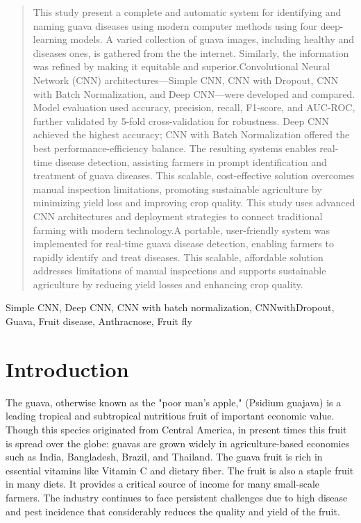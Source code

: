 \documentclass[conference]{IEEEtran}
\begin{document}
\begin{abstract}
This study present a complete and automatic system for identifying and naming guava diseases using modern computer methods using four deep-learning models. A varied collection of guava images, including healthy and diseases ones, is gathered  from the the internet. Similarly, the information was refined by making it equitable and superior.Convolutional Neural Network (CNN) architectures—Simple CNN, CNN with Dropout, CNN with Batch Normalization, and Deep CNN—were developed and compared. Model evaluation used accuracy, precision, recall, F1-score, and AUC-ROC, further validated by 5-fold cross-validation for robustness. Deep CNN achieved the highest accuracy; CNN with Batch Normalization offered the best performance-efficiency balance. The resulting systems enables real-time disease detection, assisting farmers in prompt identification and treatment of guava diseases. This scalable, cost-effective solution overcomes manual inspection limitations, promoting sustainable agriculture by minimizing yield loss and improving crop quality. This study uses advanced CNN architectures and deployment strategies to connect traditional farming with modern technology.A portable, user-friendly system was implemented for real-time guava disease detection, enabling farmers to rapidly identify and treat diseases. This scalable, affordable solution addresses limitations of manual inspections and supports sustainable agriculture by reducing yield losses and enhancing crop quality.
\end{abstract}

\begin{IEEEkeywords}
Simple CNN, Deep CNN, CNN with batch normalization, CNNwithDropout, Guava, Fruit disease, Anthracnose, Fruit fly
\end{IEEEkeywords}

\section{Introduction}
The guava, otherwise known as the "poor man's apple," (Psidium guajava) is a leading tropical and subtropical nutritious fruit of important economic value. Though this species originated from Central America, in present times this fruit is spread over the globe: guavas are grown widely in agriculture-based economies such as India, Bangladesh, Brazil, and Thailand. The guava fruit is rich in essential vitamins like Vitamin C and dietary fiber. The fruit is also a staple fruit in many diets. It provides a critical source of income for many small-scale farmers. The industry continues to face persistent challenges due to high disease and pest incidence that considerably reduces the quality and yield of the fruit.
\end{document}

